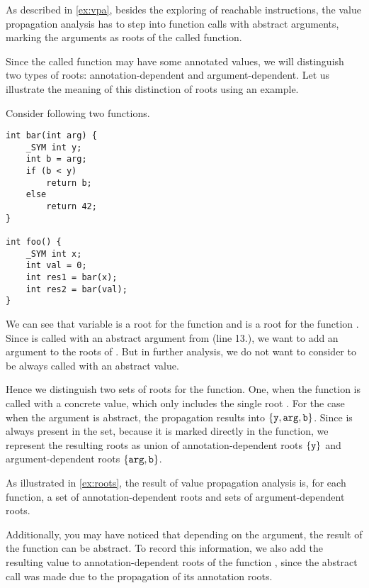 As described in \autoref{ex:vpa}, besides the exploring of reachable instructions, the value propagation analysis has to step into function calls with abstract arguments, marking the arguments as roots of the called function.

Since the called function may have some annotated values, we will distinguish
two types of roots: annotation-dependent and argument-dependent. Let us
illustrate the meaning of this distinction of roots using an example.

\begin{example} \label{ex:roots} Consider following two functions.
    \begin{verbatim}
int bar(int arg) {
    _SYM int y;
    int b = arg;
    if (b < y)
        return b;
    else
        return 42;
}

int foo() {
    _SYM int x;
    int val = 0;
    int res1 = bar(x);
    int res2 = bar(val);
}
\end{verbatim}
    We can see that variable  is a root for the function  and
     is a root for the function . Since  is called
    with an abstract argument from  (line 13.), we want to add an
    argument  to the roots of . But in further analysis, we
    do not want to consider  to be always called with an abstract
    value.

    Hence we distinguish two sets of roots for the  function. One,
    when the function is called with a concrete value, which only includes the
    single root . For the case when the argument is abstract, the
    propagation results into $\{\texttt{y}, \texttt{arg}, \texttt{b}\}$. Since
     is always present in the set, because it is marked directly in the
    function, we represent the resulting roots as union of annotation-dependent
    roots $\{\texttt{y}\}$ and argument-dependent roots $\{\texttt{arg},
    \texttt{b}\}$.
\end{example}

As illustrated in \autoref{ex:roots}, the result of value propagation analysis
is, for each function, a set of annotation-dependent roots and sets of
argument-dependent roots.

Additionally, you may have noticed that depending on the
argument, the result of the function  can be abstract. To record this
information, we also add the resulting value  to anno\-tation-dependent
roots of the function , since the abstract call was made due to the propagation of its annotation roots.

